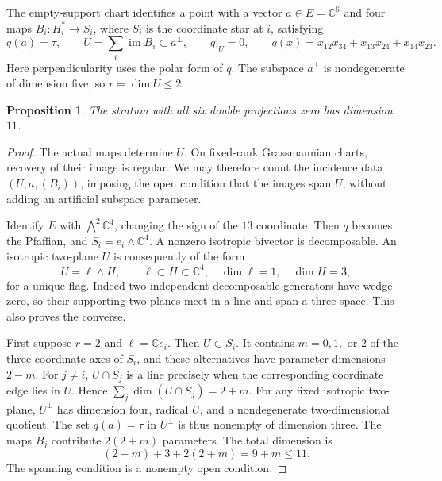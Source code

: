 \documentclass[11pt,letterpaper]{article}
\newcommand{\C}{\mathbb C}
\newcommand{\im}{\operatorname{im}}
\newtheorem{proposition}[theorem]{Proposition}
\theoremstyle{definition}
\begin{document}
The empty-support chart identifies a point with a vector
\(a\in E=\C^6\) and four maps \(B_i:H_i^*\to S_i\), where \(S_i\)
is the coordinate star at \(i\), satisfying
\begin{equation}\label{geom:empty}
 q(a)=\tau,\qquad U=\sum_i\im B_i\subset a^\perp,\qquad q|_U=0,
 \qquad q(x)=x_{12}x_{34}+x_{13}x_{24}+x_{14}x_{23}.
\end{equation}
Here perpendicularity uses the polar form of \(q\).
The subspace \(a^\perp\) is nondegenerate of dimension five, so
\(r=\dim U\le2\).

\begin{proposition}\label{geom:empty-dimension}
The stratum with all six double projections zero has dimension \(11\).
\end{proposition}
\begin{proof}
The actual maps determine \(U\). On fixed-rank Grassmannian charts,
recovery of their image is regular. We may therefore count the incidence
data \((U,a,(B_i))\), imposing the open condition that the images span \(U\),
without adding an artificial subspace parameter.

Identify \(E\) with \(\bigwedge^2\C^4\), changing the sign of the \(13\)
coordinate. Then \(q\) becomes the Pfaffian, and \(S_i=e_i\wedge\C^4\).
A nonzero isotropic bivector is decomposable. An isotropic two-plane \(U\)
is consequently of the form
\[
 U=\ell\wedge H,\qquad \ell\subset H\subset\C^4,\quad
 \dim\ell=1,\quad\dim H=3,
\]
for a unique flag. Indeed two independent decomposable generators have
wedge zero, so their supporting two-planes meet in a line and span a
three-space. This also proves the converse.

First suppose \(r=2\) and \(\ell=\C e_i\).
Then \(U\subset S_i\). It contains \(m=0,1,\) or \(2\) of the three
coordinate axes of \(S_i\), and these alternatives have parameter
dimensions \(2-m\). For \(j\ne i\), \(U\cap S_j\) is a line precisely
when the corresponding coordinate edge lies in \(U\). Hence
\(\sum_j\dim(U\cap S_j)=2+m\).
For any fixed isotropic two-plane, \(U^\perp\) has dimension four,
radical \(U\), and a nondegenerate two-dimensional quotient.
The set \(q(a)=\tau\) in \(U^\perp\) is thus nonempty of dimension three.
The maps \(B_j\) contribute \(2(2+m)\) parameters. The total dimension is
\[
 (2-m)+3+2(2+m)=9+m\le11.
\]
The spanning condition is a nonempty open condition.


\end{proof}
\end{document}
